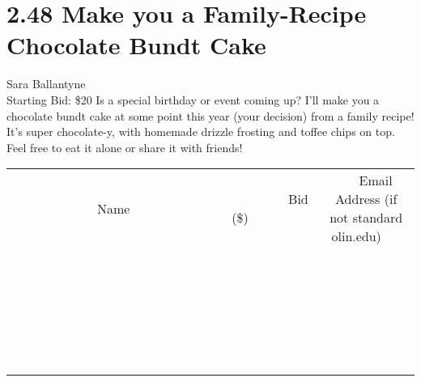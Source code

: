 \documentclass[11pt]{article}
\begin{document}
\section*{2.48 Make you a Family-Recipe Chocolate Bundt Cake}
Sara Ballantyne
\\
Starting Bid: \$20
\newline
Is a special birthday or event coming up? I'll make you a chocolate bundt cake at some point this year (your decision) from a family recipe! It's super chocolate-y, with homemade drizzle frosting and toffee chips on top. Feel free to eat it alone or share it with friends!
\\[6ex]
\begin{tabular}{c c c}
~~~~~~~~~~~~~Name~~~~~~~~~~~~~ & ~~~~~~~~~Bid (\$)~~~~~~~~~  & ~~~Email Address (if not standard olin.edu)~~~\\
 & & \\
\hline
 & & \\
\hline
 & & \\
\hline
 & & \\
\hline
 & & \\
\hline
 & & \\
\hline
 & & \\
\hline
 & & \\
\hline
 & & \\
\hline
 & & \\
\hline
 & & \\
\hline
 & & \\
\hline
 & & \\
\hline
 & & \\
\hline
 & & \\
\hline
 & & \\
\hline
 & & \\
\hline
 & & \\
\hline
 & & \\
\hline
 & & \\
\hline
 & & \\
\hline
 & & \\
\hline
 & & \\
\hline
 & & \\
\hline
 & & \\
\hline
 & & \\
\hline
\end{tabular}
\newpage
\end{document}
